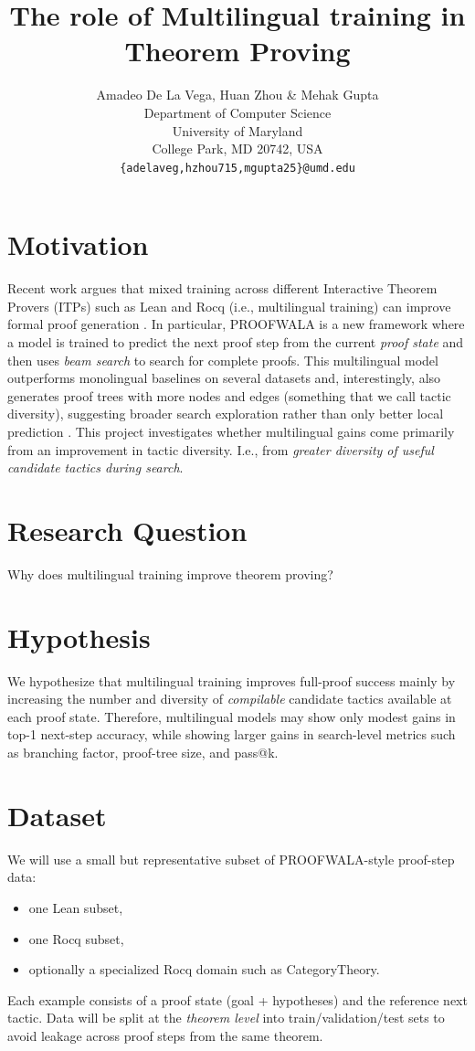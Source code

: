 \documentclass{article} %
\title{The role of Multilingual training in Theorem Proving}
\author{Amadeo De La Vega, Huan Zhou \& Mehak Gupta \\ %
Department of Computer Science\\
University of Maryland\\
College Park, MD 20742, USA \\
\texttt{\{adelaveg,hzhou715,mgupta25\}@umd.edu}
}
\begin{document}
\linenumbers

\maketitle

\section*{Motivation}
Recent work argues that mixed training across different Interactive Theorem Provers (ITPs) such as Lean and Rocq (i.e., multilingual training) can improve formal proof generation \cite{thakur2025proofwala}. In particular, \textsc{PROOFWALA} is a new framework where a model is trained to predict the next proof step from the current \textit{proof state} and then uses \textit{beam search} to search for complete proofs. This multilingual model outperforms monolingual baselines on several datasets and, interestingly, also generates proof trees with more nodes and edges (something that we call tactic diversity), suggesting broader search exploration rather than only better local prediction \cite{thakur2025proofwala}. This project investigates whether multilingual gains come primarily from an improvement in tactic diversity. I.e., from \emph{greater diversity of useful candidate tactics during search}.

\section*{Research Question}
Why does multilingual training improve theorem proving?

\section*{Hypothesis}
We  hypothesize that multilingual training improves full-proof success mainly by increasing the number and diversity of \emph{compilable} candidate tactics available at each proof state. Therefore, multilingual models may show only modest gains in top-1 next-step accuracy, while showing larger gains in search-level metrics such as branching factor, proof-tree size, and pass@k.

\section*{Dataset}
We  will use a small but representative subset of PROOFWALA-style proof-step data:
\begin{itemize}
    \item one Lean subset,
    \item one Rocq subset,
    \item optionally a specialized Rocq domain such as CategoryTheory.
\end{itemize}
Each example consists of a proof state (goal + hypotheses) and the reference next tactic. Data will be split at the \emph{theorem level} into train/validation/test sets to avoid leakage across proof steps from the same theorem.
\end{document}
